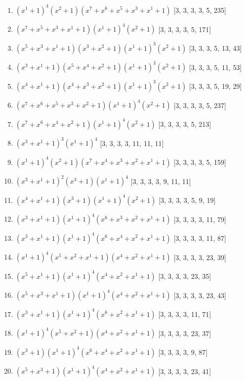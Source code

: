 \documentclass[10pt,twocolumn]{article}
\begin{document}
\begin{enumerate}
\item $(x^{1} + 1)^{4}(x^{2} + 1)(x^{7} + x^{6} + x^{5} + x^{3} + x^{1} + 1)$  [3, 3, 3, 3, 5, 235]
\item $(x^{7} + x^{5} + x^{3} + x^{1} + 1)(x^{1} + 1)^{4}(x^{2} + 1)$  [3, 3, 3, 3, 5, 171]
\item $(x^{5} + x^{3} + x^{1} + 1)(x^{3} + x^{2} + 1)(x^{1} + 1)^{3}(x^{2} + 1)$  [3, 3, 3, 5, 13, 43]
\item $(x^{3} + x^{1} + 1)(x^{5} + x^{4} + x^{2} + 1)(x^{1} + 1)^{3}(x^{2} + 1)$  [3, 3, 3, 5, 11, 53]
\item $(x^{4} + x^{1} + 1)(x^{4} + x^{3} + x^{2} + 1)(x^{1} + 1)^{3}(x^{2} + 1)$  [3, 3, 3, 5, 19, 29]
\item $(x^{7} + x^{6} + x^{5} + x^{3} + x^{2} + 1)(x^{1} + 1)^{4}(x^{2} + 1)$  [3, 3, 3, 3, 5, 237]
\item $(x^{7} + x^{6} + x^{4} + x^{2} + 1)(x^{1} + 1)^{4}(x^{2} + 1)$  [3, 3, 3, 3, 5, 213]
\item $(x^{3} + x^{1} + 1)^{3}(x^{1} + 1)^{4}$  [3, 3, 3, 3, 11, 11, 11]
\item $(x^{1} + 1)^{4}(x^{2} + 1)(x^{7} + x^{4} + x^{3} + x^{2} + x^{1} + 1)$  [3, 3, 3, 3, 5, 159]
\item $(x^{3} + x^{1} + 1)^{2}(x^{3} + 1)(x^{1} + 1)^{4}$  [3, 3, 3, 3, 9, 11, 11]
\item $(x^{4} + x^{1} + 1)(x^{3} + 1)(x^{1} + 1)^{4}(x^{2} + 1)$  [3, 3, 3, 3, 5, 9, 19]
\item $(x^{3} + x^{1} + 1)(x^{1} + 1)^{4}(x^{6} + x^{3} + x^{2} + x^{1} + 1)$  [3, 3, 3, 3, 11, 79]
\item $(x^{3} + x^{1} + 1)(x^{1} + 1)^{4}(x^{6} + x^{4} + x^{2} + x^{1} + 1)$  [3, 3, 3, 3, 11, 87]
\item $(x^{1} + 1)^{4}(x^{5} + x^{2} + x^{1} + 1)(x^{4} + x^{2} + x^{1} + 1)$  [3, 3, 3, 3, 23, 39]
\item $(x^{5} + x^{1} + 1)(x^{1} + 1)^{4}(x^{4} + x^{2} + x^{1} + 1)$  [3, 3, 3, 3, 23, 35]
\item $(x^{5} + x^{3} + x^{1} + 1)(x^{1} + 1)^{4}(x^{4} + x^{2} + x^{1} + 1)$  [3, 3, 3, 3, 23, 43]
\item $(x^{3} + x^{1} + 1)(x^{1} + 1)^{4}(x^{6} + x^{2} + x^{1} + 1)$  [3, 3, 3, 3, 11, 71]
\item $(x^{1} + 1)^{4}(x^{5} + x^{2} + 1)(x^{4} + x^{2} + x^{1} + 1)$  [3, 3, 3, 3, 23, 37]
\item $(x^{3} + 1)(x^{1} + 1)^{4}(x^{6} + x^{4} + x^{2} + x^{1} + 1)$  [3, 3, 3, 3, 9, 87]
\item $(x^{5} + x^{3} + 1)(x^{1} + 1)^{4}(x^{4} + x^{2} + x^{1} + 1)$  [3, 3, 3, 3, 23, 41]

\end{enumerate}
\end{document}
